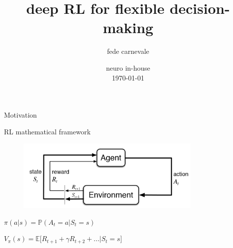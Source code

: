 \documentclass[14pt]{beamer}
\title{deep RL for flexible decision-making}
\subtitle{}
\author{fede carnevale}
\institute{zador lab}
\date{neuro in-house \\ \today}
\begin{document}
\begin{frame}[plain]
\maketitle
\end{frame}

\begin{frame}{Motivation}


\end{frame}

\begin{frame}{RL mathematical framework}


  \begin{figure}[htb]
    \includegraphics[width=0.8\textwidth]{images/rl}
  \end{figure}


  \begin{fullpageitemize}
  \item 
      \largetext{\color{colorblue}{Policy:}} $\pi \left( a \vert s \right) = \mathbb{P} \left( A_t = a \vert S_t = s \right) $
  \item 
      \largetext{\color{colorblue}{Value:}} $ V_{\pi}\left( s \right) = \mathbb{E} \lbrack R_{t+1} + \gamma R_{t+2} + ... \vert S_t = s\rbrack $
  \end{fullpageitemize}

\end{frame}
\end{document}
